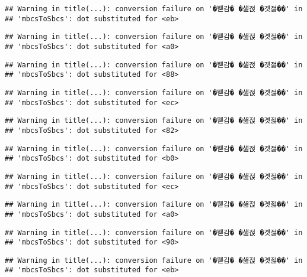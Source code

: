 \documentclass[
]{article}
\begin{document}
\begin{verbatim}
## Warning in title(...): conversion failure on '�붿감� �섎젅 �곗젏��' in
## 'mbcsToSbcs': dot substituted for <eb>
\end{verbatim}

\begin{verbatim}
## Warning in title(...): conversion failure on '�붿감� �섎젅 �곗젏��' in
## 'mbcsToSbcs': dot substituted for <a0>
\end{verbatim}

\begin{verbatim}
## Warning in title(...): conversion failure on '�붿감� �섎젅 �곗젏��' in
## 'mbcsToSbcs': dot substituted for <88>
\end{verbatim}

\begin{verbatim}
## Warning in title(...): conversion failure on '�붿감� �섎젅 �곗젏��' in
## 'mbcsToSbcs': dot substituted for <ec>
\end{verbatim}

\begin{verbatim}
## Warning in title(...): conversion failure on '�붿감� �섎젅 �곗젏��' in
## 'mbcsToSbcs': dot substituted for <82>
\end{verbatim}

\begin{verbatim}
## Warning in title(...): conversion failure on '�붿감� �섎젅 �곗젏��' in
## 'mbcsToSbcs': dot substituted for <b0>
\end{verbatim}

\begin{verbatim}
## Warning in title(...): conversion failure on '�붿감� �섎젅 �곗젏��' in
## 'mbcsToSbcs': dot substituted for <ec>
\end{verbatim}

\begin{verbatim}
## Warning in title(...): conversion failure on '�붿감� �섎젅 �곗젏��' in
## 'mbcsToSbcs': dot substituted for <a0>
\end{verbatim}

\begin{verbatim}
## Warning in title(...): conversion failure on '�붿감� �섎젅 �곗젏��' in
## 'mbcsToSbcs': dot substituted for <90>
\end{verbatim}

\begin{verbatim}
## Warning in title(...): conversion failure on '�붿감� �섎젅 �곗젏��' in
## 'mbcsToSbcs': dot substituted for <eb>
\end{verbatim}
\end{document}
